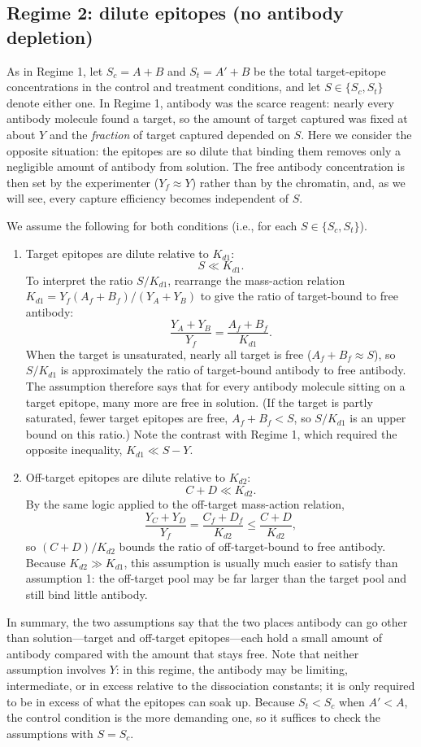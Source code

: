 \subsection{Regime 2: dilute epitopes (no antibody depletion)}

As in Regime 1, let $S_c=A+B$ and $S_t=A'+B$ be the total target-epitope
concentrations in the control and treatment conditions, and let
$S\in\{S_c,S_t\}$ denote either one. In Regime 1, antibody was the scarce
reagent: nearly every antibody molecule found a target, so the amount of
target captured was fixed at about $Y$ and the \emph{fraction} of target
captured depended on $S$. Here we consider the opposite situation: the
epitopes are so dilute that binding them removes only a negligible amount
of antibody from solution. The free antibody concentration is then set
by the experimenter ($Y_f\approx Y$) rather than by the chromatin, and,
as we will see, every capture efficiency becomes independent of $S$.

We assume the following for both conditions (i.e., for each
$S\in\{S_c,S_t\}$).

\begin{enumerate}
    \item Target epitopes are dilute relative to $K_{d1}$:
    $$
    S\ll K_{d1}.
    $$
    To interpret the ratio $S/K_{d1}$, rearrange the mass-action relation
    $K_{d1}=Y_f(A_f+B_f)/(Y_A+Y_B)$ to give the ratio of target-bound to
    free antibody:
    $$
    \frac{Y_A+Y_B}{Y_f}=\frac{A_f+B_f}{K_{d1}}.
    $$
    When the target is unsaturated, nearly all target is free
    ($A_f+B_f\approx S$), so $S/K_{d1}$ is approximately the ratio of
    target-bound antibody to free antibody. The assumption therefore says
    that for every antibody molecule sitting on a target epitope, many more
    are free in solution. (If the target is partly saturated, fewer target
    epitopes are free, $A_f+B_f<S$, so $S/K_{d1}$ is an upper bound on this
    ratio.) Note the contrast with Regime 1, which required the
    opposite inequality, $K_{d1}\ll S-Y$.

    \item Off-target epitopes are dilute relative to $K_{d2}$:
    $$
    C+D\ll K_{d2}.
    $$
    By the same logic applied to the off-target mass-action relation,
    $$
    \frac{Y_C+Y_D}{Y_f}=\frac{C_f+D_f}{K_{d2}}\le\frac{C+D}{K_{d2}},
    $$
    so $(C+D)/K_{d2}$ bounds the ratio of off-target-bound to free
    antibody. Because $K_{d2}\gg K_{d1}$, this assumption is usually much
    easier to satisfy than assumption 1: the off-target pool may be far
    larger than the target pool and still bind little antibody.
\end{enumerate}
In summary, the two assumptions say that the two places antibody can go
other than solution---target and off-target epitopes---each hold a small
amount of antibody compared with the amount that stays free. Note that
neither assumption involves $Y$: in this regime, the antibody may be
limiting, intermediate, or in excess relative to the dissociation
constants; it is only required to be in excess of what the epitopes can
soak up. Because $S_t<S_c$ when $A'<A$, the control condition is the more
demanding one, so it suffices to check the assumptions with $S=S_c$.

